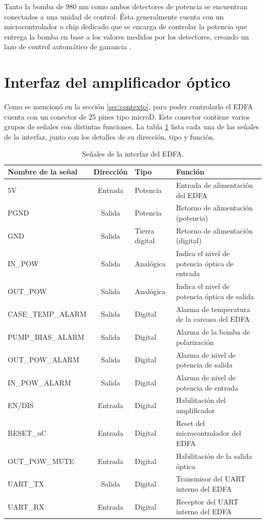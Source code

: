 Tanto la bomba de 980 nm como ambos detectores de potencia se encuentran conectados a una unidad de control. Ésta generalmente cuenta con un microcontrolador o chip dedicado que se encarga de controlar la potencia que entrega la bomba en base a los valores medidos por los detectores, creando un lazo de control automático de ganancia \citep{WEBSITE:EDFA1}\citep{WEBSITE:EDFA2}.

\section{Interfaz del amplificador óptico}
\label{sec:intAmp}

Como se mencionó en la sección \ref{sec:contexto}, para poder controlarlo el EDFA cuenta con un conector de 25 pines tipo microD. Este conector contiene varios grupos de señales con distintas funciones. La tabla \ref{tab:señalesConector} lista cada una de las señales de la interfaz, junto con los detalles de su dirección, tipo y función.

\begin{table}[H]
	\centering
	\caption{Señales de la interfaz del EDFA.}
	\begin{tabular}{l c p{1.5cm} p{5cm}}
		\toprule
		\textbf{Nombre de la señal}	& \textbf{Dirección}	& \textbf{Tipo} & \textbf{Función} \\
		\midrule
		5V 					& Entrada	& Potencia			& Entrada de alimentación del EDFA \\		
		PGND				& Salida	& Potencia  		& Retorno de alimentación (potencia) \\
		GND					& Salida	& Tierra digital  	& Retorno de alimentación (digital) \\
		IN\_POW				& Salida	& Analógica 		& Indica el nivel de potencia óptica de entrada \\
		OUT\_POW			& Salida	& Analógica 		& Indica el nivel de potencia óptica de salida \\
		CASE\_TEMP\_ALARM	& Salida	& Digital 			& Alarma de temperatura de la carcasa del EDFA \\
		PUMP\_BIAS\_ALARM	& Salida	& Digital 			& Alarma de la bomba de polarización \\
		OUT\_POW\_ALARM		& Salida	& Digital 			& Alarma de nivel de potencia de salida \\
		IN\_POW\_ALARM		& Salida	& Digital 			& Alarma de nivel de potencia de entrada \\
		EN/DIS				& Entrada	& Digital 			& Habilitación del amplificador \\
		RESET\_uC			& Entrada	& Digital 			& Reset del microcontrolador del EDFA \\
		OUT\_POW\_MUTE		& Entrada	& Digital 			& Habilitación de la salida óptica \\
		UART\_TX			& Salida	& Digital 			& Transmisor del UART interno del EDFA \\
		UART\_RX			& Entrada	& Digital 			& Receptor del UART interno del EDFA \\
		\bottomrule
		\hline
	\end{tabular}
	\label{tab:señalesConector}
\end{table}

